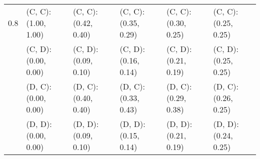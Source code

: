 \begin{tabular}{ l | l l l l l }
\hline 
0.8 & (C, C): (1.00, 1.00) & (C, C): (0.42, 0.40) & (C, C): (0.35, 0.29) & (C, C): (0.30, 0.25) & (C, C): (0.25, 0.25) \\ 
 & (C, D): (0.00, 0.00) & (C, D): (0.09, 0.10) & (C, D): (0.16, 0.14) & (C, D): (0.21, 0.19) & (C, D): (0.25, 0.25) \\ 
 & (D, C): (0.00, 0.00) & (D, C): (0.40, 0.40) & (D, C): (0.33, 0.43) & (D, C): (0.29, 0.38) & (D, C): (0.26, 0.25) \\ 
 & (D, D): (0.00, 0.00) & (D, D): (0.09, 0.10) & (D, D): (0.15, 0.14) & (D, D): (0.21, 0.19) & (D, D): (0.24, 0.25) \\ 

\end{tabular}





